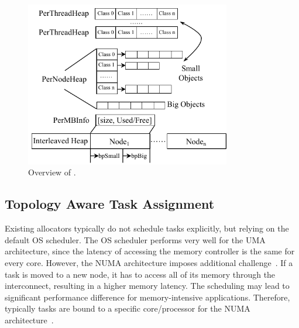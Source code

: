 \begin{figure}[h]
\begin{center}
\includegraphics[width=0.8\textwidth]{figure/heaplayout1}
\end{center}
\vspace{-0.1in}
\caption{Overview of \NA{}.
\label{fig:overview}}
\vspace{-0.1in}
\end{figure}

\subsection{Topology Aware Task Assignment} 
\label{sec:taskassign}

Existing allocators typically do not schedule tasks explicitly, but relying on the default OS scheduler. The OS scheduler performs very well for the UMA architecture, since the latency of accessing the memory controller is the same for every core. However, the NUMA architecture imposes additional challenge~\cite{Majo:2015:LPC:2688500.2688509}. If a task is moved to a new node, it has to access all of its memory through the interconnect, resulting in a higher memory latency. The scheduling may lead to significant performance difference for memory-intensive applications. Therefore, typically tasks are bound to a specific core/processor for the NUMA architecture~\cite{terboven2012assessing, terboven2012task, Majo:2015:LPC:2688500.2688509}.  

